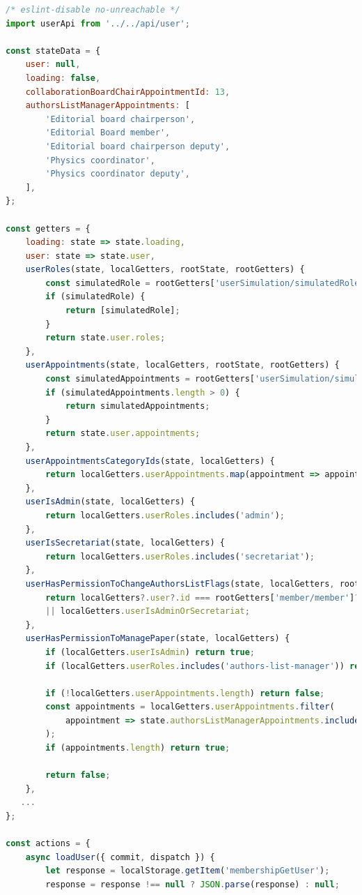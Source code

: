 \begin{lstlisting}[language=javascript, caption={Vuex User Store Module.}, label=lst:vuex_user]
/* eslint-disable no-unreachable */
import userApi from '../../api/user';

const stateData = {
    user: null,
    loading: false,
    collaborationBoardChairAppointmentId: 13,
    authorsListManagerAppointments: [
        'Editorial board chairperson',
        'Editorial Board member',
        'Editorial board chairperson deputy',
        'Physics coordinator',
        'Physics coordinator deputy',
    ],
};

const getters = {
    loading: state => state.loading,
    user: state => state.user,
    userRoles(state, localGetters, rootState, rootGetters) {
        const simulatedRole = rootGetters['userSimulation/simulatedRole'];
        if (simulatedRole) {
            return [simulatedRole];
        }
        return state.user.roles;
    },
    userAppointments(state, localGetters, rootState, rootGetters) {
        const simulatedAppointments = rootGetters['userSimulation/simulatedAppointments'];
        if (simulatedAppointments.length > 0) {
            return simulatedAppointments;
        }
        return state.user.appointments;
    },
    userAppointmentsCategoryIds(state, localGetters) {
        return localGetters.userAppointments.map(appointment => appointment.category.id);
    },
    userIsAdmin(state, localGetters) {
        return localGetters.userRoles.includes('admin');
    },
    userIsSecretariat(state, localGetters) {
        return localGetters.userRoles.includes('secretariat');
    },
    userHasPermissionToChangeAuthorsListFlags(state, localGetters, rootState, rootGetters) {
        return localGetters?.user?.id === rootGetters['member/member']?.id
        || localGetters.userIsAdminOrSecretariat;
    },
    userHasPermissionToManagePaper(state, localGetters) {
        if (localGetters.userIsAdmin) return true;
        if (localGetters.userRoles.includes('authors-list-manager')) return true;

        if (!localGetters.userAppointments.length) return false;
        const appointments = localGetters.userAppointments.filter(
            appointment => state.authorsListManagerAppointments.includes(appointment.category.name),
        );
        if (appointments.length) return true;

        return false;
    },
   ...
};

const actions = {
    async loadUser({ commit, dispatch }) {
        let response = localStorage.getItem('membershipGetUser');
        response = response !== null ? JSON.parse(response) : null;


\end{lstlisting}
